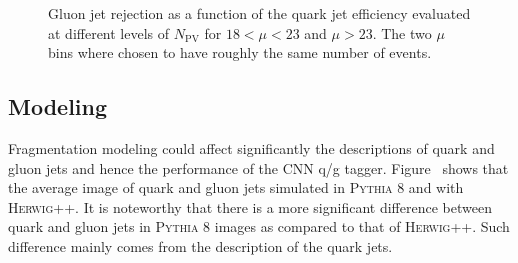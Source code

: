 
\begin{figure}[htpb]
\begin{center}
\caption{Gluon jet rejection as a function of the quark jet efficiency 
evaluated at different levels of $N_\text{PV}$ for \protect{} $18<\mu<23$ and \protect{}  $\mu > 23$.
The two $\mu$ bins where chosen to have roughly the same number of events.}
\label{fig:cnn-pileup2}
\end{center}
\end{figure}


\subsection{Modeling}

Fragmentation modeling could affect significantly the descriptions of quark and gluon jets and hence
the performance of the CNN q/g tagger.
Figure~\label{fig:cnn-avg:CNN} shows that the average image of quark and gluon jets simulated in 
\textsc{Pythia} 8 and with \textsc{Herwig++}. It is noteworthy that there is a more significant difference between
quark and gluon jets in \textsc{Pythia} 8 images as compared to that of \textsc{Herwig++}. Such difference mainly comes
from the description of the quark jets. 

